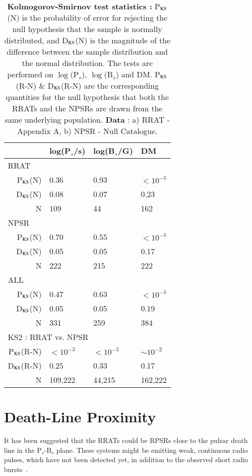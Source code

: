 \documentclass{jaa}
\begin{document}
%
\begin{table}[h]
%
\centering
\begin{tabular}{ r l l l} \toprule
  & log(P$_s$/s) & log(B$_s$/G) & DM          \\ \midrule
\multicolumn{4}{l}{RRAT} \\
 P$_{\rm KS}$(N) & 0.36 & 0.93 & $< 10^{-5}$ \\ 
 D$_{\rm KS}$(N) & 0.08 & 0.07 & 0.23 \\ 
 N     & 109    & 44     & 162    \\ \midrule
\multicolumn{4}{l}{NPSR} \\
 P$_{\rm KS}$(N) & 0.70 & 0.55 & $< 10^{-5}$ \\
 D$_{\rm KS}$(N) & 0.05 & 0.05 & 0.17 \\
 N     & 222    & 215    & 222    \\ \midrule
 \multicolumn{4}{l}{ALL} \\
 P$_{\rm KS}$(N) & 0.47 & 0.63 & $< 10^{-5}$ \\
 D$_{\rm KS}$(N) & 0.05 & 0.05 & 0.19 \\
 N     & 331    & 259    & 384       \\  \midrule
\midrule
\multicolumn{4}{l}{KS2 : RRAT vs. NPSR} \\ 
 P$_{\rm KS}$(R-N) & $< 10^{-3}$ & $< 10^{-3}$ & $\sim 10^{-2}$ \\
 D$_{\rm KS}$(R-N)  & 0.25 & 0.33 & 0.17 \\
 N  & 109,222    & 44,215 & 162,222    \\  \hline
\end{tabular}
%
\caption{{\bf Kolmogorov-Smirnov test statistics :} P$_{\rm KS}$(N) is
  the probability of error for  rejecting the null hypothesis that the
  sample is normally distributed, and D$_{\rm KS}$(N) is the magnitude
  of the  difference between  the sample  distribution and  the normal
  distribution.    The   tests   are   performed   on   $\log$(P$_s$),
  $\log$(B$_s$) and DM. P$_{\rm KS}$(R-N) \& D$_{\rm KS}$(R-N) are the
  corresponding quantities for the null hypothesis that both the RRATs
  and the NPSRs  are drawn from the same  underlying population.  {\bf
    Data} : a) RRAT - Appendix A, b) NPSR - Null Catalogue.}
%
\label{t_stat-II}
%  
\end{table}
%


%
\section{Death-Line Proximity}
%
It  has been  suggested that  the RRATs  could be  RPSRs close  to the
pulsar death line  in the  P$_s$-B$_s$ plane.  These  systems might be
emitting weak, continuous  radio pulses, which have  not been detected
yet, in addition to the observed short radio bursts~\cite{welte06}.
\end{document}
